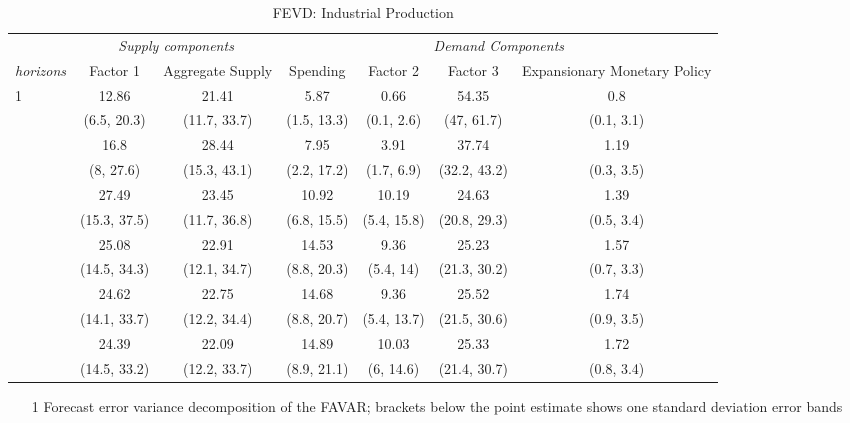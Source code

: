 \begin{table}\caption{ FEVD: Industrial Production }\begin{adjustbox}{max width=\linewidth} 
\begin{tabular}{lcccccc}
\toprule 
 & \multicolumn{2}{c}{\textit{Supply components}} & \multicolumn{4}{c}{\textit{Demand Components}} \\ 
 \cmidrule(l){2-3} \cmidrule(l){4-7} 
\textit{horizons} & Factor 1 & Aggregate Supply & Spending & Factor 2 & Factor 3 & Expansionary Monetary Policy \\ 
\midrule 
1 & 12.86 & 21.41 & 5.87 & 0.66 & 54.35 & 0.8 \\ 
  & (6.5, 20.3) & (11.7, 33.7) & (1.5, 13.3) & (0.1, 2.6) & (47, 61.7) & (0.1, 3.1) \\ 
\addlinespace 
2 & 16.8 & 28.44 & 7.95 & 3.91 & 37.74 & 1.19 \\ 
  & (8, 27.6) & (15.3, 43.1) & (2.2, 17.2) & (1.7, 6.9) & (32.2, 43.2) & (0.3, 3.5) \\ 
\addlinespace 
3 & 27.49 & 23.45 & 10.92 & 10.19 & 24.63 & 1.39 \\ 
  & (15.3, 37.5) & (11.7, 36.8) & (6.8, 15.5) & (5.4, 15.8) & (20.8, 29.3) & (0.5, 3.4) \\ 
\addlinespace 
6 & 25.08 & 22.91 & 14.53 & 9.36 & 25.23 & 1.57 \\ 
  & (14.5, 34.3) & (12.1, 34.7) & (8.8, 20.3) & (5.4, 14) & (21.3, 30.2) & (0.7, 3.3) \\ 
\addlinespace 
12 & 24.62 & 22.75 & 14.68 & 9.36 & 25.52 & 1.74 \\ 
  & (14.1, 33.7) & (12.2, 34.4) & (8.8, 20.7) & (5.4, 13.7) & (21.5, 30.6) & (0.9, 3.5) \\ 
\addlinespace 
24 & 24.39 & 22.09 & 14.89 & 10.03 & 25.33 & 1.72 \\ 
  & (14.5, 33.2) & (12.2, 33.7) & (8.9, 21.1) & (6, 14.6) & (21.4, 30.7) & (0.8, 3.4) \\ 
\bottomrule 
\end{tabular} 
\end{adjustbox}
\begin{minipage}{\textwidth} 
{\footnotesize
\begin{enumerate}
\vspace{2mm}
    \item[1] Forecast error variance decomposition of the FAVAR; brackets below the point estimate shows one standard deviation error bands
\end{enumerate}}
     \end{minipage}
\end{table}